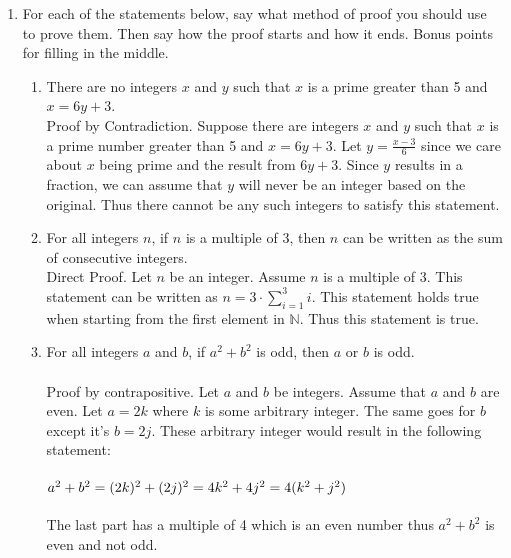 \documentclass[11pt,a4paper]{article}
\begin{document}
\begin{enumerate}
\begin{enumerate}
            \end{enumerate}


        \item For each of the statements below, say what method of proof you should use to prove them. Then say how the proof starts and how it ends. Bonus points for filling in the middle.
            \begin{enumerate}
                \item There are no integers $x$ and $y$ such that $x$ is a prime greater than 5 and $x = 6y + 3$.\\
                    Proof by Contradiction. Suppose there are integers $x$ and $y$ such that $x$ is a prime number greater than 5 and $x = 6y + 3$. Let $y = \frac{x - 3}{6}$ since we care about $x$ being prime and the result from $6y + 3$. Since $y$ results in a fraction, we can assume that $y$ will never be an integer based on the original. Thus there cannot be any such integers to satisfy this statement.
                \item For all integers $n$, if $n$ is a multiple of 3, then $n$ can be written as the sum of consecutive integers.\\
                    Direct Proof. Let $n$ be an integer. Assume $n$ is a multiple of 3. This statement can be written as $ n = 3\cdot\sum_{i = 1}^{3}i$. This statement holds true when starting from the first element in $\mathbb{N}$. Thus this statement is true.
                \item For all integers $a$ and $b$, if $a^2 + b^2$ is odd, then $a$ or $b$ is odd.\\\\
                    Proof by contrapositive. Let $a$ and $b$ be integers. Assume that $a$ and $b$ are even. Let $a = 2k$ where $k$ is some arbitrary integer. The same goes for $b$ except it's $b = 2j$. These arbitrary integer would result in the following statement:\\\\
                    $a^2 + b^2 = (2k)^2+(2j)^2\\ = 4k^2 + 4j^2\\ = 4(k^2 + j^2)$\\\\
                    The last part has a multiple of 4 which is an even number thus $a^2 + b^2$ is even and not odd.
            \end{enumerate}


\end{enumerate}
\end{document}
